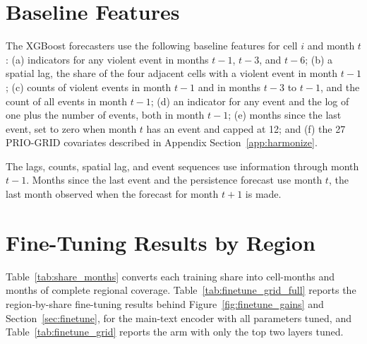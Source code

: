 \documentclass[11pt, letterpaper]{article}
\begin{document}
\section{Baseline Features}
\label{app:features}
The XGBoost forecasters use the following baseline features for cell $i$ and month $t$: (a) indicators for any violent event in months $t-1$, $t-3$, and $t-6$; (b) a spatial lag, the share of the four adjacent cells with a violent event in month $t-1$; (c) counts of violent events in month $t-1$ and in months $t-3$ to $t-1$, and the count of all events in month $t-1$; (d) an indicator for any event and the log of one plus the number of events, both in month $t-1$; (e) months since the last event, set to zero when month $t$ has an event and capped at 12; and (f) the 27 PRIO-GRID covariates described in Appendix Section~\ref{app:harmonize}.

The lags, counts, spatial lag, and event sequences use information through month $t-1$. Months since the last event and the persistence forecast use month $t$, the last month observed when the forecast for month $t+1$ is made.

\section{Fine-Tuning Results by Region}
\label{app:finetune_table}
Table~\ref{tab:share_months} converts each training share into cell-months and months of complete regional coverage. Table~\ref{tab:finetune_grid_full} reports the region-by-share fine-tuning results behind Figure~\ref{fig:finetune_gains} and Section~\ref{sec:finetune}, for the main-text encoder with all parameters tuned, and Table~\ref{tab:finetune_grid} reports the arm with only the top two layers tuned.
\end{document}
